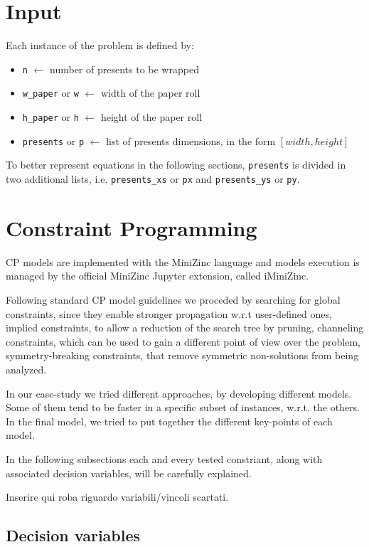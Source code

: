\documentclass[a4paper,10pt]{article}
\begin{document}
\section{Input}
Each instance of the problem is defined by:
\begin{itemize}
   \item \texttt{n} $\longleftarrow$ number of presents to be wrapped
   \item \texttt{w\_paper} or \texttt{w} $\longleftarrow$ width of the paper roll
   \item \texttt{h\_paper} or \texttt{h} $\longleftarrow$ height of the paper roll
   \item \texttt{presents} or \texttt{p} $\longleftarrow$ list of presents dimensions, in the form $[width,height]$
\end{itemize}

To better represent equations in the following sections, \texttt{presents} is divided in two additional lists, i.e. \texttt{presents\_xs} or \texttt{px} and \texttt{presents\_ys} or \texttt{py}.

\section{Constraint Programming}
CP models are implemented with the MiniZinc language and models execution is managed by the official MiniZinc Jupyter extension, called iMiniZinc.

Following standard CP model guidelines we proceded by searching for global constraints, since they enable stronger propagation w.r.t user-defined ones, implied constraints, to allow a reduction of the search tree by pruning, channeling constraints, which can be used to gain a different point of view over the problem, symmetry-breaking constraints, that remove symmetric non-solutions from being analyzed.

In our case-study we tried different approaches, by developing different models. Some of them tend to be faster in a specific subset of instances, w.r.t. the others. In the final model, we tried to put together the different key-points of each model.

In the following subsections each and every tested constriant, along with associated decision variables, will be carefully explained.

Inserire qui roba riguardo variabili/vincoli scartati.
\subsection{Decision variables}
\end{document}
